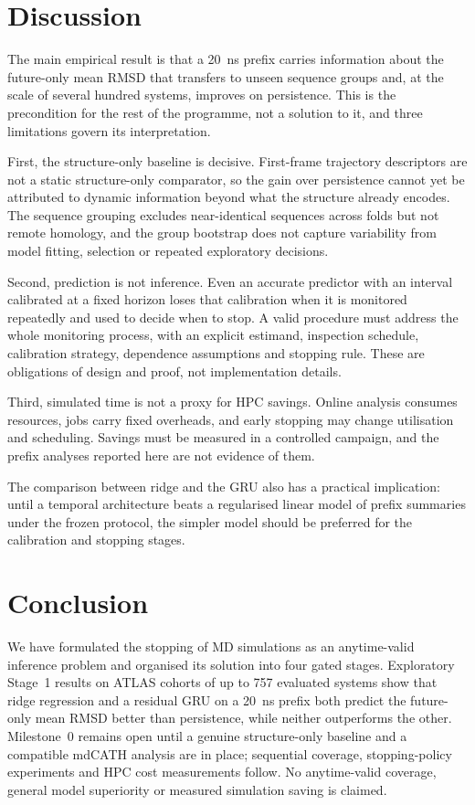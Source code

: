 \documentclass[11pt]{article}
\begin{document}
\section{Discussion}

The main empirical result is that a 20~ns prefix carries information about the future-only mean RMSD that transfers to unseen sequence groups and, at the scale of several hundred systems, improves on persistence. This is the precondition for the rest of the programme, not a solution to it, and three limitations govern its interpretation.

First, the structure-only baseline is decisive. First-frame trajectory descriptors are not a static structure-only comparator, so the gain over persistence cannot yet be attributed to dynamic information beyond what the structure already encodes. The sequence grouping excludes near-identical sequences across folds but not remote homology, and the group bootstrap does not capture variability from model fitting, selection or repeated exploratory decisions.

Second, prediction is not inference. Even an accurate predictor with an interval calibrated at a fixed horizon loses that calibration when it is monitored repeatedly and used to decide when to stop. A valid procedure must address the whole monitoring process, with an explicit estimand, inspection schedule, calibration strategy, dependence assumptions and stopping rule. These are obligations of design and proof, not implementation details.

Third, simulated time is not a proxy for HPC savings. Online analysis consumes resources, jobs carry fixed overheads, and early stopping may change utilisation and scheduling. Savings must be measured in a controlled campaign, and the prefix analyses reported here are not evidence of them.

The comparison between ridge and the GRU also has a practical implication: until a temporal architecture beats a regularised linear model of prefix summaries under the frozen protocol, the simpler model should be preferred for the calibration and stopping stages.

\section{Conclusion}

We have formulated the stopping of MD simulations as an anytime-valid inference problem and organised its solution into four gated stages. Exploratory Stage~1 results on ATLAS cohorts of up to 757 evaluated systems show that ridge regression and a residual GRU on a 20~ns prefix both predict the future-only mean RMSD better than persistence, while neither outperforms the other. Milestone~0 remains open until a genuine structure-only baseline and a compatible mdCATH analysis are in place; sequential coverage, stopping-policy experiments and HPC cost measurements follow. No anytime-valid coverage, general model superiority or measured simulation saving is claimed.
\end{document}
